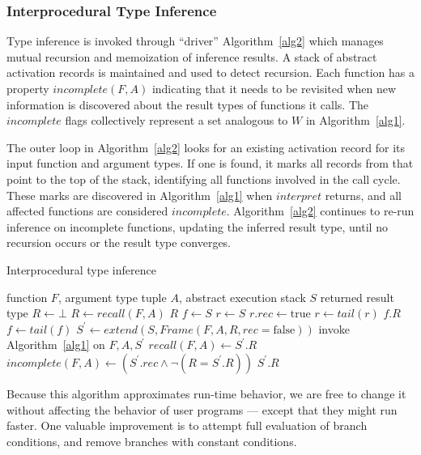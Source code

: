\documentclass[9pt]{sigplanconf}
\begin{document}
\subsubsection{Interprocedural Type Inference}

Type inference is invoked through ``driver'' Algorithm~\ref{alg2}
which manages mutual recursion and memoization of inference results.
A stack of abstract activation records is maintained and used to detect
recursion. Each function has a property $incomplete(F,A)$ indicating that
it needs to be revisited when new information is discovered about the
result types of functions it calls. The $incomplete$ flags collectively
represent a set analogous to $W$ in Algorithm~\ref{alg1}.

The outer loop in Algorithm~\ref{alg2} looks for an existing activation
record for its input function and argument types. If one is found, it
marks all records from that point to the top of the stack, identifying
all functions involved in the call cycle. These marks
are discovered in Algorithm~\ref{alg1} when $interpret$ returns, and all
affected functions are considered $incomplete$. Algorithm~\ref{alg2}
continues to re-run inference on incomplete functions, updating the
inferred result type, until no recursion occurs or the result type
converges.

\begin{algorithm}
\caption{Interprocedural type inference}
\label{alg2}
\begin{algorithmic}
\REQUIRE function $F$, argument type tuple $A$, abstract execution stack $S$
\ENSURE returned result type
\STATE $R \leftarrow \bot$
 \STATE $R \leftarrow recall(F,A)$
  \RETURN $R$
 \ENDIF
\ENDIF
\STATE $f \leftarrow S$
  \STATE $r \leftarrow S$
   \STATE $r.rec \leftarrow \text{true}$
   \STATE $r \leftarrow tail(r)$
  \ENDWHILE
  \RETURN $f.R$
 \ENDIF
 \STATE $f \leftarrow tail(f)$
\ENDWHILE
\STATE $S^{\prime} \leftarrow extend(S, Frame(F,A,R,rec=\text{false}))$
\STATE invoke Algorithm~\ref{alg1} on $F,A,S^{\prime}$
\STATE $recall(F,A) \leftarrow S^{\prime}.R$
\STATE $incomplete(F,A) \leftarrow (S^{\prime}.rec \land \neg(R=S^{\prime}.R))$
\RETURN $S^{\prime}.R$
\end{algorithmic}
\end{algorithm}

Because this algorithm approximates run-time behavior, we are free to
change it without affecting the behavior of user programs --- except
that they might run faster. One valuable improvement is
to attempt full evaluation of branch conditions, and remove branches
with constant conditions.
\end{document}
